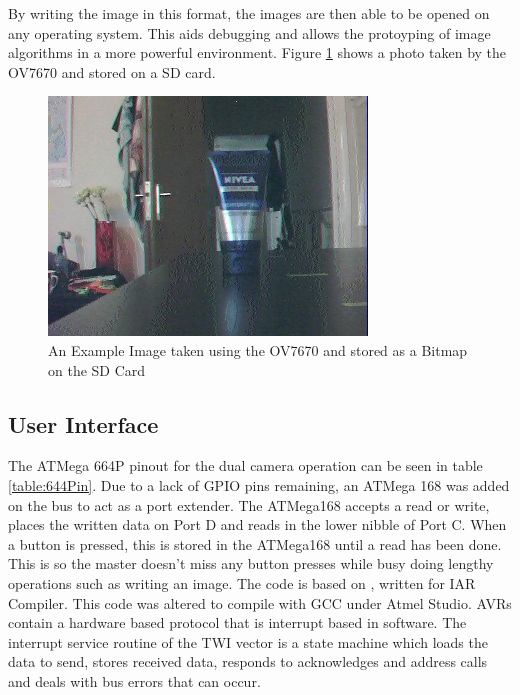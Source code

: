 By writing the image in this format, the images are then able to be opened on any operating system. This aids debugging and allows the protoyping of image algorithms in a more powerful environment. Figure \ref{ExampleImage} shows a photo taken by the OV7670 and stored on a SD card.

\begin{figure}
\begin{center}
\includegraphics{Figures/ExampleImageFromCamera.jpg} 
\end{center}
\caption{An Example Image taken using the OV7670 and stored as a Bitmap on the SD Card}
\label{ExampleImage}
\end{figure}

\subsection{User Interface}
The ATMega 664P pinout for the dual camera operation can be seen in table \ref{table:644Pin}. Due to a lack of GPIO pins remaining, an ATMega 168 was added on the \itc bus to act as a port extender. The ATMega168 accepts a read or write, places the written data on Port D and reads in the lower nibble of Port C. When a button is pressed, this is stored in the ATMega168 until a read has been done. This is so the master doesn't miss any button presses while busy doing lengthy operations such as writing an image. The code is based on \cite{Atmel:I2CSlave}, written for IAR Compiler. This code was altered to compile with GCC under Atmel Studio. AVRs contain a hardware based \itc protocol that is interrupt based in software. The interrupt service routine of the TWI vector is a state machine which loads the data to send, stores received data, responds to acknowledges and address calls and deals with bus errors that can occur.

